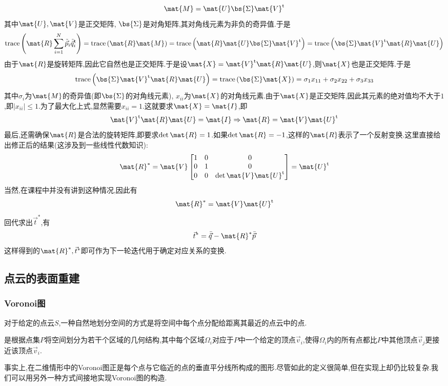 \documentclass{ctexart}
\begin{document}
\[\mat{M}=\mat{U}\bs{\Sigma}\mat{V}^{\text{t}}\]
其中$\mat{U},\mat{V}$是正交矩阵, $\bs{\Sigma}$是对角矩阵,其对角线元素为非负的奇异值.于是
\[\text{trace}\left(\mat{R}\sum_{i=1}^{N}\tilde{\vec{p}}_i\tilde{\vec{q}}_i^{\text{t}}\right)=\text{trace}\left(\mat{R}\mat{M}\right)=\text{trace}\left(\mat{R}\mat{U}\bs{\Sigma}\mat{V}^{\text{t}}\right)=\text{trace}\left(\bs{\Sigma}\mat{V}^{\text{t}}\mat{R}\mat{U}\right)\]
由于$\mat{R}$是旋转矩阵,因此它自然也是正交矩阵.于是设$\mat{X}=\mat{V}^{\text{t}}\mat{R}\mat{U}$,则$\mat{X}$也是正交矩阵.于是
\[\text{trace}\left(\bs{\Sigma}\mat{V}^{\text{t}}\mat{R}\mat{U}\right)=\text{trace}\left(\bs{\Sigma}\mat{X}\right)=\sigma_1x_{11}+\sigma_2x_{22}+\sigma_3x_{33}\]
其中$\sigma_i$为$\mat{M}$的奇异值(即$\bs{\Sigma}$的对角线元素), $x_{ii}$为$\mat{X}$的对角线元素.由于$\mat{X}$是正交矩阵,因此其元素的绝对值均不大于$1$,即$|x_{ii}|\leq 1$.为了最大化上式,显然需要$x_{ii}=1$.这就要求$\mat{X}=\mat{I}$,即
\[\mat{V}^{\text{t}}\mat{R}\mat{U}=\mat{I}\Rightarrow \mat{R}=\mat{V}\mat{U}^{\text{t}}\]
最后,还需确保$\mat{R}$是合法的旋转矩阵,即要求$\det\mat{R}=1$.如果$\det\mat{R}=-1$,这样的$\mat{R}$表示了一个反射变换.这里直接给出修正后的结果(这涉及到一些线性代数知识):
\[\mat{R}^\ast=\mat{V}\begin{bmatrix}
    1&0&0\\0&1&0\\0&0&\det\mat{V}\mat{U}^{\text{t}}
\end{bmatrix}=\mat{U}^{\text{t}}\]
当然,在课程中并没有讲到这种情况,因此有
\[\mat{R}^\ast=\mat{V}\mat{U}^{\text{t}}\]
回代求出$\vec{t}^\ast$,有
\[\vec{t}^\ast=\bar{\vec{q}}-\mat{R}^\ast\bar{\vec{p}}\]
这样得到的$\mat{R}^\ast,\vec{t}^\ast$即可作为下一轮迭代用于确定对应关系的变换.
\subsection{点云的表面重建}
\subsubsection{Voronoi图}
对于给定的点云$S$,一种自然地划分空间的方式是将空间中每个点分配给距离其最近的点云中的点.
\begin{definition}[Voronoi图]
    是根据点集$P$将空间划分为若干个区域的几何结构,其中每个区域$\Omega_i$对应于$P$中一个给定的顶点$\vec{v}_i$,使得$\Omega_i$内的所有点都比$P$中其他顶点$\vec{v}_j$更接近该顶点$\vec{v}_i$.
\end{definition}
事实上,在二维情形中的Voronoi图正是每个点与它临近的点的垂直平分线所构成的图形.尽管如此的定义很简单,但在实现上却仍比较复杂.我们可以用另外一种方式间接地实现Voronoi图的构造.
\end{document}
